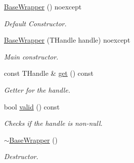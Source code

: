 \begin{DoxyCompactItemize}
\item 
\mbox{\label{structblaze_1_1vkw_1_1base_1_1BaseWrapper_a87d61fbfd8fa3fdfd8aad1a621e6a63a}} 
\hyperlink{structblaze_1_1vkw_1_1base_1_1BaseWrapper_a87d61fbfd8fa3fdfd8aad1a621e6a63a}{Base\+Wrapper} () noexcept
\begin{DoxyCompactList}\small\item\em Default Constructor. \end{DoxyCompactList}\item 
\hyperlink{structblaze_1_1vkw_1_1base_1_1BaseWrapper_a5569991b2ff88d2a758dcc7d93141c96}{Base\+Wrapper} (T\+Handle handle) noexcept
\begin{DoxyCompactList}\small\item\em Main constructor. \end{DoxyCompactList}\item 
\mbox{\label{structblaze_1_1vkw_1_1base_1_1BaseWrapper_afe04eafe1e8c18c911a648d229e4cb10}} 
const T\+Handle \& \hyperlink{structblaze_1_1vkw_1_1base_1_1BaseWrapper_afe04eafe1e8c18c911a648d229e4cb10}{get} () const
\begin{DoxyCompactList}\small\item\em Getter for the handle. \end{DoxyCompactList}\item 
bool \hyperlink{structblaze_1_1vkw_1_1base_1_1BaseWrapper_aa6499ac388955fe4a6a6b729f4a48ca8}{valid} () const
\begin{DoxyCompactList}\small\item\em Checks if the handle is non-\/null. \end{DoxyCompactList}\item 
\mbox{\label{structblaze_1_1vkw_1_1base_1_1BaseWrapper_a469f239211552a5befc6bb243ded472a}} 
\hyperlink{structblaze_1_1vkw_1_1base_1_1BaseWrapper_a469f239211552a5befc6bb243ded472a}{$\sim$\+Base\+Wrapper} ()
\begin{DoxyCompactList}\small\item\em Destructor. \end{DoxyCompactList}\end{DoxyCompactItemize}
